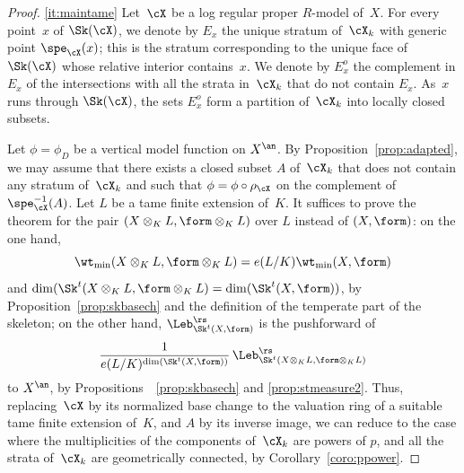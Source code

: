 \skpt
\begin{proof}
\eqref{it:maintame}
Let~$\cX$ be a log regular proper $R$\nobreakdash-model of~$X$.
For every point~$x$ of $\Sk(\cX)$, we denote by $E_x$ the unique stratum of~$\cX_k$ with generic point $\spe_{\cX}(x)$; this is the stratum corresponding to the unique face of $\Sk(\cX)$ whose relative interior contains~$x$. We denote by $E_x^o$ the complement in $E_x$ of the intersections with all the strata in~$\cX_k$ that do not contain $E_x$.
As~$x$ runs through $\Sk(\cX)$, the sets $E_x^o$ form a partition of~$\cX_k$ into locally closed subsets.

Let $\phi=\phi_D$ be a vertical model function on $X^{\an}$. By Proposition~\ref{prop:adapted}, we may assume that there exists a closed subset $A$ of~$\cX_k$ that does not contain any stratum of~$\cX_k$ and such that
$\phi=\phi\circ \rho_{\cX}$ on the complement of $\spe^{-1}_{\cX}(A)$.
Let $L$ be a tame finite extension of~$K$. It suffices to prove the theorem for the pair $(X\otimes_K L,\form\otimes_K L)$ over $L$ instead of $(X,\form)$: on the one hand,
\[
\wt_{\min}(X\otimes_K L,\form\otimes_K L)=e(L/K)\wt_{\min}(X,\form)
\]
and $\dim(\Sk^t(X\otimes_K L,\form\otimes_K L)=\dim(\Sk^t(X,\form))$, by Proposition~\ref{prop:skbasech} and the definition of the temperate part of the skeleton; on the other hand,
$\Leb^{\rs}_{\Sk^t(X,\form)}$ is the pushforward of
\[
\frac{1}{e(L/K)^{\dim(\Sk^t(X,\form))}}\,\Leb^{\rs}_{\Sk^t(X\otimes_K L,\form\otimes_K L)}
\]
to $X^{\an}$, by Propositions~~\ref{prop:skbasech} and \ref{prop:stmeasure2}. Thus, replacing~$\cX$ by its normalized base change to the valuation ring of a suitable tame finite extension of~$K$, and $A$ by its inverse image, we can reduce to the case where the multiplicities of the components of~$\cX_k$ are powers of $p$, and all the strata of~$\cX_k$ are geometrically connected, by Corollary~\ref{coro:ppower}.


\end{proof}
